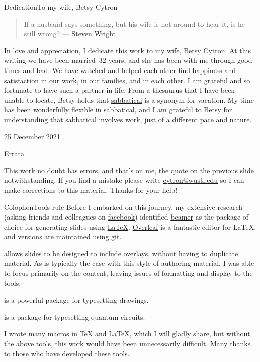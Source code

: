 \begin{frame}{Dedication}{To my wife, Betsy Cytron}
\begin{quote}
    If a husband says something, but his wife is not around to hear it, is he still wrong? --- \href{https://en.wikipedia.org/wiki/Steven_Wright}{Steven Wright}
\end{quote}
In love and appreciation, I dedicate this work to my wife, Betsy Cytron.  At this writing we have been married~32 years, and she has been with me through good times and bad. We have watched and helped each other find happiness and satisfaction in our work, in our families, and in each other.  I am grateful and so fortunate to have such a partner in life.
\SmallSkip{}
From a thesaurus that I have been unable to locate,  Betsy holds that \href{https://www.merriam-webster.com/dictionary/sabbatical}{sabbatical} is a synonym for vacation.  My time has been wonderfully flexible in sabbatical, and I am grateful to Betsy for understanding that sabbatical involves work, just of a different pace and nature.
\begin{flushright}25 December 2021\end{flushright}
\end{frame}
\begin{frame}{Errata}

This work no doubt has errors, and that's on me, the quote on the previous slide notwithstanding.  If you find a mistake please write \href{mailto:cytron@wustl.edu}{cytron@wustl.edu} so I can make corrections to this material.
\SmallSkip{}
Thanks for your help!
\end{frame}

\begin{frame}{Colophon}{Tools rule}
Before I embarked on this journey, my extensive research (asking friends and colleagues on \href{https://en.wikipedia.org/wiki/Facebook}{facebook}) identified \href{https://en.wikipedia.org/wiki/Beamer_(LaTeX)}{beamer} as the package of choice for generating slides using \href{https://en.wikibooks.org/wiki/LaTeX}{\LaTeX}.  \href{https://en.wikipedia.org/wiki/Overleaf}{Overleaf} is a fantastic editor for \LaTeX, and versions are maintained using \href{https://en.wikipedia.org/wiki/Git}{git}.

\begin{description}[<+->]
  \item[beamer] allows slides to be designed to include overlays, without having to duplicate material. As is typically the case with this style of authoring material, I was able to focus primarily on the content, leaving issues of formatting and display to the tools.
  \item[\href{https://en.wikibooks.org/wiki/LaTeX/PGF/TikZ}{tikz}] is a powerful package for typesetting drawings.
  \item[\href{https://ctan.org/pkg/quantikz?lang=en}{quantikz}] is a package for typesetting quantum circuits.
\end{description}
I wrote many macros in \TeX{} and \LaTeX{}, which I will gladly share, but without the above tools, this work would have been unnecessarily difficult.  Many thanks to those who have developed these tools.
\end{frame}

